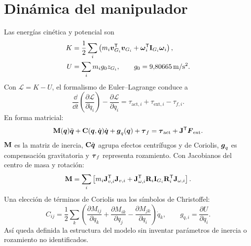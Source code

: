 \section{Dinámica del manipulador}
Las energías cinética y potencial son
\begin{align}
K&=\frac12\sum_i\left(m_i\boldsymbol{v}_{G_i}^{\mathsf{T}}\boldsymbol{v}_{G_i}
+\boldsymbol{\omega}_i^{\mathsf{T}}\mathbf{I}_{G_i}\boldsymbol{\omega}_i\right),\\
U&=\sum_i m_ig_0z_{G_i},\qquad g_0=9{,}80665\,\mathrm{m/s^2}.
\end{align}
Con $\mathcal L=K-U$, el formalismo de Euler--Lagrange conduce a
\begin{equation}
\frac{\dd}{\dd t}\left(\frac{\partial\mathcal L}{\partial\dot q_i}\right)
-\frac{\partial\mathcal L}{\partial q_i}
=\tau_{\mathrm{act},i}+\tau_{\mathrm{ext},i}-\tau_{f,i}.
\end{equation}
En forma matricial:
\begin{equation}
\mathbf{M}(\boldsymbol{q})\ddot{\boldsymbol{q}}+\mathbf{C}(\boldsymbol{q},\dot{\boldsymbol{q}})\dot{\boldsymbol{q}}
+\boldsymbol{g}_q(\boldsymbol{q})+\boldsymbol{\tau}_f
=\boldsymbol{\tau}_{\mathrm{act}}+\mathbf{J}^{\mathsf{T}}\boldsymbol{F}_{\mathrm{ext}}.
\label{eq:dinamica}
\end{equation}
$\mathbf{M}$ es la matriz de inercia, $\mathbf{C}\dot{\boldsymbol{q}}$ agrupa efectos centrífugos y de Coriolis, $\boldsymbol{g}_q$ es compensación gravitatoria y $\boldsymbol{\tau}_f$ representa rozamiento. Con Jacobianos del centro de masa y rotación:
\begin{equation}
\mathbf{M}=\sum_i\left[m_i\mathbf{J}_{v,i}^{\mathsf{T}}\mathbf{J}_{v,i}
+\mathbf{J}_{\omega,i}^{\mathsf{T}}\mathbf{R}_i\mathbf{I}_{G_i}\mathbf{R}_i^{\mathsf{T}}\mathbf{J}_{\omega,i}\right].
\end{equation}
Una elección de términos de Coriolis usa los símbolos de Christoffel:
\begin{equation}
C_{ij}=\frac12\sum_k\left(
\frac{\partial M_{ij}}{\partial q_k}+
\frac{\partial M_{ik}}{\partial q_j}-
\frac{\partial M_{jk}}{\partial q_i}\right)\dot q_k,
\qquad g_{q,i}=\frac{\partial U}{\partial q_i}.
\end{equation}
Así queda definida la estructura del modelo sin inventar parámetros de inercia o rozamiento no identificados.

